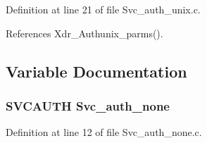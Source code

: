 Definition at line 21 of file Svc\_\-auth\_\-unix.c.

References Xdr\_\-Authunix\_\-parms().

\subsection{Variable Documentation}
\subsubsection{\setlength{\rightskip}{0pt plus 5cm}SVCAUTH {\bf Svc\_\-auth\_\-none}}\label{Svc__auth__unix_8c_a0}




Definition at line 12 of file Svc\_\-auth\_\-none.c.